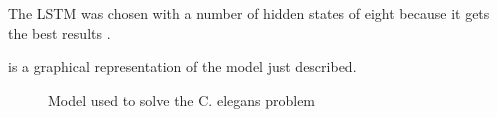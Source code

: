 The \ac{LSTM} was chosen with a number of hidden states of eight because it gets the best results \cite{celegans}.

 is a graphical representation of the model just described.

\begin{figure}[H]
  \centering
  
  \caption{Model used to solve the \ac{C. elegans} problem}
  \label{fig:celegansModel}
\end{figure}
